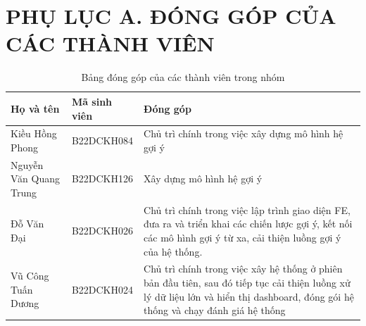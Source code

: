 \documentclass[../BTL.tex]{subfiles}
\begin{document}
    \chapter*{PHỤ LỤC A. ĐÓNG GÓP CỦA CÁC THÀNH VIÊN}
\label{appendix:phan_cong}

\begin{table}[H]
\centering
\label{tab:phan_cong}
\begin{tabular}{|l|l|p{6cm}|}
\hline
\textbf{Họ và tên} & \textbf{Mã sinh viên} & \textbf{Đóng góp} \\
\hline
Kiều Hồng Phong & B22DCKH084 & Chủ trì chính trong việc xây dựng mô hình hệ gợi ý \\
\hline
Nguyễn Văn Quang Trung & B22DCKH126 & Xây dựng mô hình hệ gợi ý \\
\hline
Đỗ Văn Đại & B22DCKH026 & Chủ trì chính trong việc lập trình giao diện FE, đưa ra và triển khai các chiến lược gợi ý, kết nối các mô hình gợi ý từ xa, cải thiện luồng gợi ý của hệ thống. \\
\hline
Vũ Công Tuấn Dương & B22DCKH024 & Chủ trì chính trong việc xây hệ thống ở phiên bản đầu tiên, sau đó tiếp tục cải thiện luồng xử lý dữ liệu lớn và hiển thị dashboard, đóng gói hệ thống và chạy đánh giá hệ thống\\
\hline
\end{tabular}
\caption{Bảng đóng góp của các thành viên trong nhóm}
\end{table}
\end{document}

